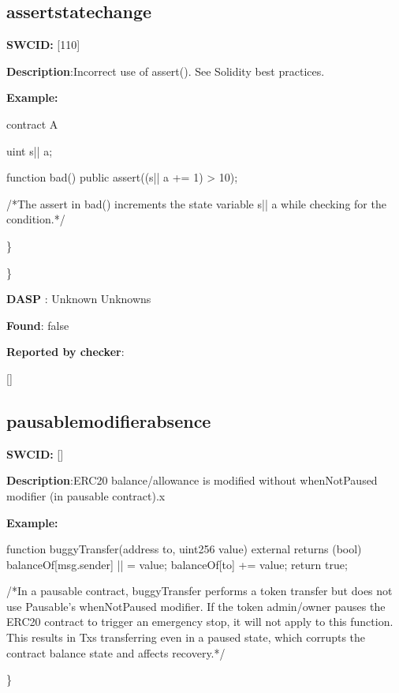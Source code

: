\documentclass{article}
\begin{document}
\subsection{assert{\textunderscore}state{\textunderscore}change} 
\textbf{SWC{\textunderscore}ID:} [110]

\textbf{Description}:Incorrect use of assert(). See Solidity best practices.


\textbf{Example:} 
\begin{ffcode} 

contract A {
  uint s|\textunderscore| a;

  function bad() public {
    assert((s|\textunderscore| a += 1) > 10);
  }
}
 /*The assert in bad() increments the state variable s|\textunderscore| a while checking for the condition.*/ 

\end{ffcode} 
\} 

\} 

\textbf{DASP} : Unknown Unknowns

\textbf{Found}: false

\textbf{Reported by checker}: 
\begin{ffcode} 

[]
\end{ffcode} 
\subsection{pausable{\textunderscore}modifier{\textunderscore}absence} 
\textbf{SWC{\textunderscore}ID:} []

\textbf{Description}:ERC20 balance/allowance is modified without whenNotPaused modifier (in pausable contract).x


\textbf{Example:} 
\begin{ffcode} 

function buggyTransfer(address to, uint256 value) external returns (bool){
        balanceOf[msg.sender] |\textendash| = value;
        balanceOf[to] += value;
        return true;
    }

 /*In a pausable contract, buggyTransfer performs a token transfer but does not use Pausable's whenNotPaused modifier. If the token admin/owner pauses the ERC20 contract to trigger an emergency stop, it will not apply to this function. This results in Txs transferring even in a paused state, which corrupts the contract balance state and affects recovery.*/ 

\end{ffcode} 
\} 
\end{document}

